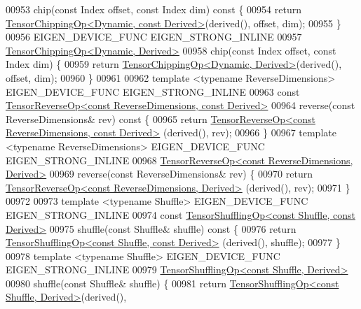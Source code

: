 \begin{DoxyCode}
00953     chip(\textcolor{keyword}{const} Index offset, \textcolor{keyword}{const} Index dim)\textcolor{keyword}{ const }\{
00954       \textcolor{keywordflow}{return} \hyperlink{class_eigen_1_1_tensor_chipping_op}{TensorChippingOp<Dynamic, const Derived>}(derived(), 
      offset, dim);
00955     \}
00956     EIGEN\_DEVICE\_FUNC EIGEN\_STRONG\_INLINE
00957     \hyperlink{class_eigen_1_1_tensor_chipping_op}{TensorChippingOp<Dynamic, Derived>}
00958     chip(\textcolor{keyword}{const} Index offset, \textcolor{keyword}{const} Index dim) \{
00959       \textcolor{keywordflow}{return} \hyperlink{class_eigen_1_1_tensor_chipping_op}{TensorChippingOp<Dynamic, Derived>}(derived(), offset, dim);
00960     \}
00961 
00962     \textcolor{keyword}{template} <\textcolor{keyword}{typename} ReverseDimensions> EIGEN\_DEVICE\_FUNC EIGEN\_STRONG\_INLINE
00963     \textcolor{keyword}{const} \hyperlink{class_eigen_1_1_tensor_reverse_op}{TensorReverseOp<const ReverseDimensions, const Derived>}
00964     reverse(\textcolor{keyword}{const} ReverseDimensions& rev)\textcolor{keyword}{ const }\{
00965       \textcolor{keywordflow}{return} \hyperlink{class_eigen_1_1_tensor_reverse_op}{TensorReverseOp<const ReverseDimensions, const Derived>}
      (derived(), rev);
00966     \}
00967     \textcolor{keyword}{template} <\textcolor{keyword}{typename} ReverseDimensions> EIGEN\_DEVICE\_FUNC EIGEN\_STRONG\_INLINE
00968     \hyperlink{class_eigen_1_1_tensor_reverse_op}{TensorReverseOp<const ReverseDimensions, Derived>}
00969     reverse(\textcolor{keyword}{const} ReverseDimensions& rev) \{
00970       \textcolor{keywordflow}{return} \hyperlink{class_eigen_1_1_tensor_reverse_op}{TensorReverseOp<const ReverseDimensions, Derived>}
      (derived(), rev);
00971     \}
00972 
00973     \textcolor{keyword}{template} <\textcolor{keyword}{typename} Shuffle> EIGEN\_DEVICE\_FUNC EIGEN\_STRONG\_INLINE
00974     \textcolor{keyword}{const} \hyperlink{class_eigen_1_1_tensor_shuffling_op}{TensorShufflingOp<const Shuffle, const Derived>}
00975     shuffle(\textcolor{keyword}{const} Shuffle& shuffle)\textcolor{keyword}{ const }\{
00976       \textcolor{keywordflow}{return} \hyperlink{class_eigen_1_1_tensor_shuffling_op}{TensorShufflingOp<const Shuffle, const Derived>}
      (derived(), shuffle);
00977     \}
00978     \textcolor{keyword}{template} <\textcolor{keyword}{typename} Shuffle> EIGEN\_DEVICE\_FUNC EIGEN\_STRONG\_INLINE
00979     \hyperlink{class_eigen_1_1_tensor_shuffling_op}{TensorShufflingOp<const Shuffle, Derived>}
00980     shuffle(\textcolor{keyword}{const} Shuffle& shuffle) \{
00981       \textcolor{keywordflow}{return} \hyperlink{class_eigen_1_1_tensor_shuffling_op}{TensorShufflingOp<const Shuffle, Derived>}(derived(), 

\end{DoxyCode}
